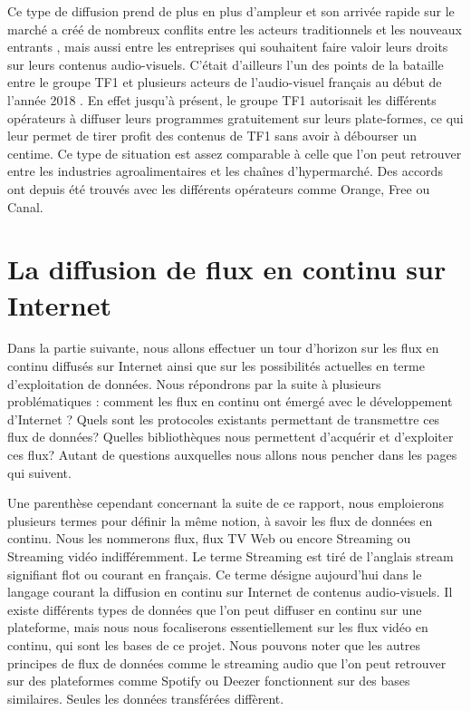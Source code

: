 \documentclass{polytech/polytech}
\begin{document}
Ce type de diffusion prend de plus en plus d'ampleur et son arrivée rapide sur le marché a créé de nombreux conflits entre les acteurs traditionnels et les nouveaux entrants \cite{_lott_2013}, mais aussi entre les entreprises qui souhaitent faire valoir leurs droits sur leurs contenus audio-visuels. C'était d'ailleurs l'un des points de la bataille entre le groupe TF1 et plusieurs acteurs de l'audio-visuel français au début de l'année 2018 \cite{_guerre_2018}. En effet jusqu'à présent, le groupe TF1 autorisait les différents opérateurs à diffuser leurs programmes gratuitement sur leurs plate-formes, ce qui leur permet de tirer profit des contenus de TF1 sans avoir à débourser un centime. Ce type de situation est assez comparable à celle que l'on peut retrouver entre les industries agroalimentaires et les chaînes d'hypermarché. Des accords ont depuis été trouvés avec les différents opérateurs comme Orange, Free ou Canal.


\chapter{La diffusion de flux en continu sur Internet}
\label{chap:diffusion_flux}

Dans la partie suivante, nous allons effectuer un tour d’horizon sur les flux en continu diffusés sur Internet ainsi que sur les possibilités actuelles en terme d’exploitation de données. Nous répondrons par la suite à plusieurs problématiques : comment les flux en continu ont émergé avec le développement d’Internet ? Quels sont les protocoles existants permettant de transmettre ces flux de données? Quelles bibliothèques nous permettent d’acquérir et d’exploiter ces flux? Autant de questions auxquelles nous allons nous pencher dans les pages qui suivent.

Une parenthèse cependant concernant la suite de ce rapport, nous emploierons plusieurs termes pour définir la même notion, à savoir les flux de données en continu. Nous les nommerons flux, flux TV Web ou encore Streaming ou Streaming vidéo indifféremment. Le terme Streaming est tiré de l’anglais stream signifiant flot ou courant en français. Ce terme désigne aujourd’hui dans le langage courant la diffusion en continu sur Internet de contenus audio-visuels. Il existe différents types de données que l’on peut diffuser en continu sur une plateforme, mais nous nous focaliserons essentiellement sur les flux vidéo en continu, qui sont les bases de ce projet. Nous pouvons noter que les autres principes de flux de données comme le streaming audio que l’on peut retrouver sur des plateformes comme Spotify ou Deezer fonctionnent sur des bases similaires. Seules les données transférées diffèrent.
\end{document}
